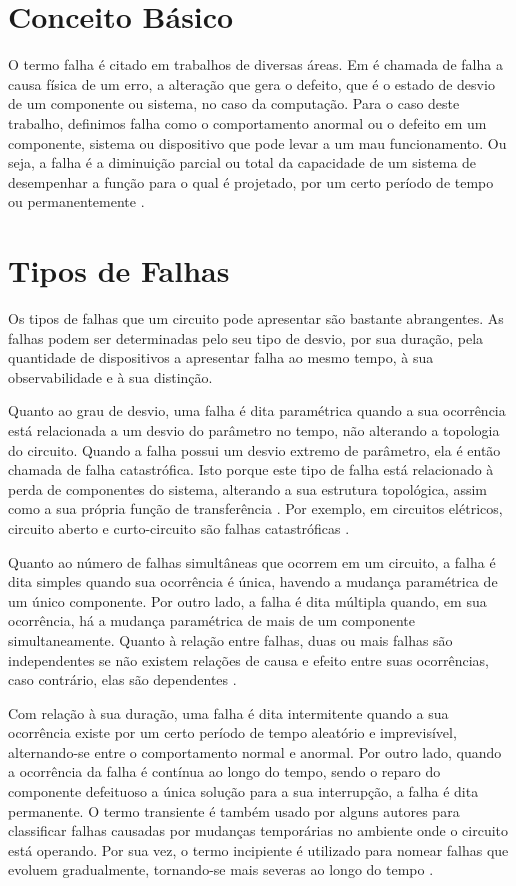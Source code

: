 \section{\textbf{Conceito Básico}}

O termo falha é citado em trabalhos de diversas áreas. Em \cite{WEBER} é chamada de falha a causa física de um erro, a alteração que gera o defeito, que é o estado de desvio de um componente ou sistema, no caso da computação.
Para o caso deste trabalho, definimos falha como o comportamento anormal ou o defeito em um componente, sistema ou dispositivo que pode levar a um mau funcionamento. Ou seja, a falha é a diminuição parcial ou total da capacidade de um sistema de desempenhar a função para o qual é projetado, por um certo período de tempo ou permanentemente \cite{lombardi}.

\section{\textbf{Tipos de Falhas}}

Os tipos de falhas que um circuito pode apresentar são bastante abrangentes. As falhas podem ser determinadas pelo seu tipo de desvio, por sua duração, pela quantidade de dispositivos a apresentar falha ao mesmo tempo, à sua observabilidade e à sua distinção.

Quanto ao grau de desvio, uma falha é dita paramétrica quando a sua ocorrência está relacionada a um desvio do parâmetro no tempo, não alterando a topologia do circuito. Quando a falha possui um desvio extremo de parâmetro, ela é então chamada de falha catastrófica. Isto porque este tipo de falha está relacionado à perda de componentes do sistema, alterando a sua estrutura topológica, assim como a sua própria função de transferência \cite{LUO}. Por exemplo, em circuitos elétricos, circuito aberto e curto-circuito são falhas catastróficas \cite{DUHAMEL}.

Quanto ao número de falhas simultâneas que ocorrem em um circuito, a falha é dita simples quando sua ocorrência é única, havendo a mudança paramétrica de um único componente. Por outro lado, a falha é dita múltipla quando, em sua ocorrência, há a mudança paramétrica de mais de um componente simultaneamente. Quanto à relação entre falhas, duas ou mais falhas são independentes se não existem relações de causa e efeito entre suas ocorrências, caso contrário, elas são dependentes \cite{lombardi}.

Com relação à sua duração, uma falha é dita intermitente quando a sua ocorrência existe por um certo período de tempo aleatório e imprevisível, alternando-se entre o comportamento normal e anormal. Por outro lado, quando a ocorrência da falha é contínua ao longo do tempo, sendo o reparo do componente defeituoso a única solução para a sua interrupção, a falha é dita permanente. O termo transiente é também usado por alguns autores para classificar falhas causadas por mudanças temporárias no ambiente onde o circuito está operando. Por sua vez, o termo incipiente é utilizado para nomear falhas que evoluem gradualmente, tornando-se mais severas ao longo do tempo \cite{MANDERS}.

